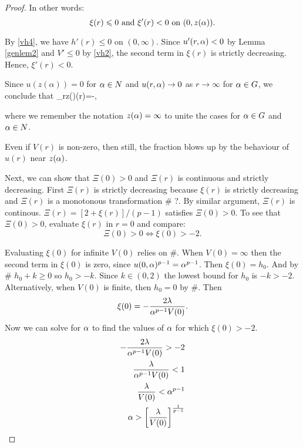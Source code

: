 \begin{proof}
In other words: 
$$\xi(r)\leqslant0\text{ and }\xi'(r)<0\text{ on }(0,z(\alpha)).$$ 

By \eqref{vh4}, we have $h'(r) \leq 0$ on $(0, \infty)$. Since $u'(r, \alpha) < 0$
by Lemma \ref{genlem2} and $V' \leq 0$ by \eqref{vh2}, the second term in
$\xi(r)$ is strictly decreasing. Hence, $\xi'(r) < 0$. 

% 

Since $u(z(\alpha))=0$ for $\alpha \in N$ and $u(r, \alpha) \to 0$ as $r \to \infty$ for
$\alpha \in G$, we conclude that 
\be \label{xilim}
    \lim_{r\to z(\alpha)}\xi(r)=-\infty,
\ee

{\red where we remember the notation $z(\alpha) = \infty$ to unite the cases for $\alpha
\in G$ and $\alpha \in N$.}

Even if $V(r)$ is non-zero, then still, the fraction blows up by the behaviour
of $u(r)$ near $z(\alpha)$.

Next, we can show that $\Xi(0)>0$ and $\Xi(r)$ is continuous and strictly
decreasing. First $\Xi(r)$ is strictly decreasing because $\xi(r)$ is strictly
decreasing and $\Xi(r)$ is a monotonous transformation \# ?. By similar
argument, $\Xi(r)$ is continous. $\Xi(r)=\left[2+\xi(r)\right]/(p-1)$ satisfies
$\Xi(0)>0$. To see that $\Xi(0)>0$, evaluate $\xi(r)$ in $r=0$ and compare:
$$\Xi(0)>0\iff\xi(0)>-2.$$

Evaluating $\xi(0)$ for infinite $V(0)$ relies on \#. When $V(0)=\infty$ then
the second term in $\xi(0)$ is zero, since $u(0,\alpha)^{p-1}=\alpha^{p-1}$. Then
$\xi(0)=h_0$. And by \# $h_0+k\geq0$ so $h_0>-k$. Since $k\in(0,2)$ the lowest
bound for $h_0$ is $-k>-2$. Alternatively, when $V(0)$ is finite, then $h_0=0$
by \#. Then $$\xi(0)=-\frac{2\lambda}{\alpha^{p-1}V(0)}.$$ Now we can solve for $\alpha$
to find the values of $\alpha$ for which $\xi(0)>-2$.  
\begin{align*}
-\frac{2\lambda}{\alpha^{p-1}V(0)}>-2\\ \frac{\lambda}{\alpha^{p-1}V(0)}<1\\
\frac{\lambda}{V(0)}<\alpha^{p-1}\\ 
\alpha > \left[\frac{\lambda}{V(0)}\right]^{\frac{1}{p-1}} 
\end{align*} 


\end{proof}
